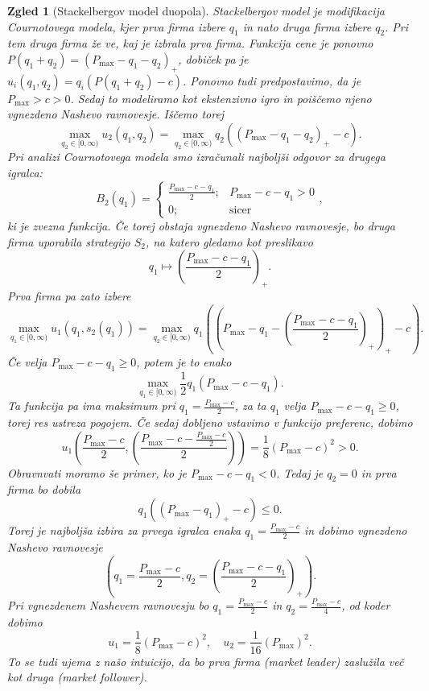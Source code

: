 \documentclass[10pt, a4paper]{article}
\newtheorem{zgled}[izr]{Zgled}
\begin{document}
\begin{zgled}[Stackelbergov model duopola]
  Stackelbergov model je modifikacija Cournotovega modela,
  kjer prva firma izbere $q_1$ in nato druga firma izbere $q_2$.
  Pri tem druga firma že ve, kaj je izbrala prva firma.
  Funkcija cene je ponovno $P(q_1 + q_2) = (P_{\max} -q_1 -q_2)_+$,
  dobiček pa je $u_i (q_1, q_2) = q_i(P(q_1 + q_2) - c)$.
  Ponovno tudi predpostavimo, da je $P_{\max} > c >0$.
  Sedaj to modeliramo kot ekstenzivno igro in poiščemo njeno vgnezdeno Nashevo ravnovesje.
  Iščemo torej 
  $$\max_{q_2 \in [0, \infty)} u_2 (q_1, q_2) = \max_{q_2 \in [0, \infty)} q_2 ((P_{\max} - q_1 - q_2)_+ - c).$$
  Pri analizi Cournotovega modela smo izračunali najboljši odgovor za drugega igralca:
  $$B_2 (q_1) = \begin{cases}
    \frac{P_{\max} - c - q_1}{2};& P_{\max} - c- q_1 > 0\\
    0;& \textrm{sicer}
  \end{cases},$$
  ki je zvezna funkcija. Če torej obstaja vgnezdeno Nashevo ravnovesje, bo druga firma uporabila strategijo $S_2$, 
  na katero gledamo kot preslikavo 
  $$q_1 \mapsto \left(\frac{P_{\max} - c - q_1}{2}\right)_+.$$
  Prva firma pa zato izbere 
  $$\max_{q_1 \in [0, \infty)} u_1 (q_1, s_2 (q_1)) = \max_{q_2 \in [0, \infty)} q_1 \left(\left(P_{\max} - q_1 - \left(\frac{P_{\max} - c- q_1}{2}\right)_+\right)_+ - c\right).$$
  Če velja $P_{\max} - c - q_1 \geq 0$, potem je to enako 
  $$\max_{q_1 \in [0, \infty)} \frac{1}{2} q_1 (P_{\max} - c - q_1).$$
  Ta funkcija pa ima maksimum pri $q_1 = \frac{P_{\max} - c}{2}$, za ta $q_1$ velja $P_{\max} - c - q_1 \geq 0$, torej 
  res ustreza pogojem. Če sedaj dobljeno vstavimo v funkcijo preferenc, dobimo 
  $$u_1\left(\frac{P_{\max} - c}{2}, \left(\frac{P_{\max} - c - \frac{P_{\max} - c}{2}}{2}\right)\right) = \frac{1}{8} (P_{\max} - c)^2 > 0.$$ 
  Obravnvati moramo še primer, ko je $P_{\max} - c - q_1 < 0$.
  Tedaj je $q_2 = 0$ in prva firma bo dobila 
  $$q_1 ((P_{\max} - q_1)_+ - c) \leq 0.$$
  Torej je najboljša izbira za prvega igralca enaka $q_1 = \frac{P_{\max} - c}{2}$
  in dobimo vgnezdeno Nashevo ravnovesje 
  $$\left(q_1 = \frac{P_{\max} - c}{2}, q_2 = \left(\frac{P_{\max} - c - q_1}{2}\right)_+\right).$$
  Pri vgnezdenem Nashevem ravnovesju bo $q_1 = \frac{P_{\max} - c}{2}$ in $q_2 = \frac{P_{\max} - c}{4}$, od koder dobimo 
  $$u_1 = \frac{1}{8} (P_{\max} - c)^2,\quad u_2 = \frac{1}{16} (P_{\max})^2.$$
  To se tudi ujema z našo intuicijo, da bo prva firma (market leader)
  zaslužila več kot druga (market follower).
\end{zgled}
\end{document}
